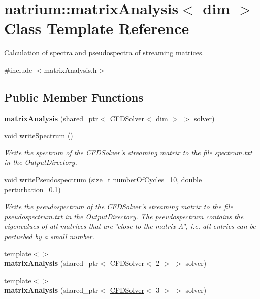 \hypertarget{classnatrium_1_1matrixAnalysis}{
\section{natrium::matrixAnalysis$<$ dim $>$ Class Template Reference}
\label{classnatrium_1_1matrixAnalysis}
}


Calculation of spectra and pseudospectra of streaming matrices.  


{\ttfamily \#include $<$matrixAnalysis.h$>$}\subsection*{Public Member Functions}
\begin{DoxyCompactItemize}
\item 
\hypertarget{classnatrium_1_1matrixAnalysis_ab1434eb6a7256560cbeaf2f3869709ed}{
{\bfseries matrixAnalysis} (shared\_\-ptr$<$ \hyperlink{classnatrium_1_1CFDSolver}{CFDSolver}$<$ dim $>$ $>$ solver)}
\label{classnatrium_1_1matrixAnalysis_ab1434eb6a7256560cbeaf2f3869709ed}

\item 
void \hyperlink{classnatrium_1_1matrixAnalysis_af83535a0c1c83db223649b958c245df1}{writeSpectrum} ()
\begin{DoxyCompactList}\small\item\em Write the spectrum of the CFDSolver's streaming matrix to the file spectrum.txt in the OutputDirectory. \item\end{DoxyCompactList}\item 
void \hyperlink{classnatrium_1_1matrixAnalysis_a2c18eb04461c90bfdf3f301e8c9dfc1b}{writePseudospectrum} (size\_\-t numberOfCycles=10, double perturbation=0.1)
\begin{DoxyCompactList}\small\item\em Write the pseudospectrum of the CFDSolver's streaming matrix to the file pseudospectrum.txt in the OutputDirectory. The pseudospectrum contains the eigenvalues of all matrices that are \char`\"{}close to the matrix A\char`\"{}, i.e. all entries can be perturbed by a small number. \item\end{DoxyCompactList}\item 
\hypertarget{classnatrium_1_1matrixAnalysis_add02c431de70315545299e44eba1eaf5}{
{\footnotesize template$<$$>$ }\\{\bfseries matrixAnalysis} (shared\_\-ptr$<$ \hyperlink{classnatrium_1_1CFDSolver}{CFDSolver}$<$ 2 $>$ $>$ solver)}
\label{classnatrium_1_1matrixAnalysis_add02c431de70315545299e44eba1eaf5}

\item 
\hypertarget{classnatrium_1_1matrixAnalysis_a53e5e6b7c952ead585c1c5b28a1e2cac}{
{\footnotesize template$<$$>$ }\\{\bfseries matrixAnalysis} (shared\_\-ptr$<$ \hyperlink{classnatrium_1_1CFDSolver}{CFDSolver}$<$ 3 $>$ $>$ solver)}
\label{classnatrium_1_1matrixAnalysis_a53e5e6b7c952ead585c1c5b28a1e2cac}

\end{DoxyCompactItemize}
